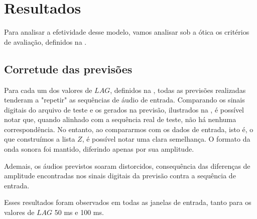 \section{Resultados}

Para analisar a efetividade desse modelo, vamos analisar sob a ótica os critérios de avaliação, definidos na .

\subsection{Corretude das previsões}

Para cada um dos valores de $LAG$, definidos na , todas as previsões realizadas tenderam a "repetir" as sequências de áudio de entrada. Comparando os sinais digitais do arquivo de teste e os gerados na previsão, ilustrados na , é possível notar que, quando alinhado com a sequência real de teste, não há nenhuma correspondência. No entanto, ao compararmos com os dados de entrada, isto é, o que construímos a lista $Z$, é possível notar uma clara semelhança. O formato da onda sonora foi mantido, diferindo apenas por sua amplitude.

Ademais, os áudios previstos soaram distorcidos, consequência das diferenças de amplitude encontradas nos sinais digitais da previsão contra a sequência de entrada.

Esses resultados foram observados em todas as janelas de entrada, tanto para os valores de $LAG$ 50 ms e 100 ms.

